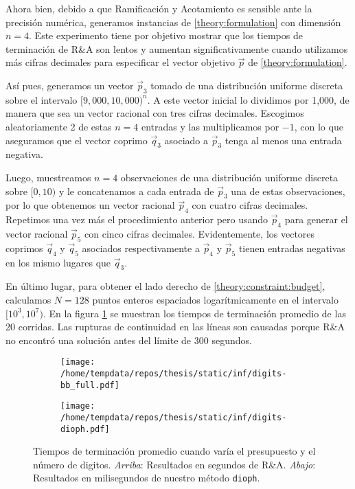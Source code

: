 Ahora bien, debido a que Ramificación y Acotamiento es sensible ante la precisión numérica,
generamos instancias de \eqref{theory:formulation} con dimensión $n = 4$. Este experimento tiene por
objetivo mostrar que los tiempos de terminación de R\&A son lentos y aumentan significativamente
cuando utilizamos más cifras decimales para especificar el vector objetivo $\vec{p}$ de
\eqref{theory:formulation}.

Así pues, generamos un vector $\vec{p}_3$ tomado de una distribución uniforme discreta sobre el
intervalo $[9{,}000, 10{,}000)^n$. A este vector inicial lo dividimos por 1{,}000, de manera que sea un
vector racional con tres cifras decimales. Escogimos aleatoriamente 2 de estas $n = 4$ entradas y
las multiplicamos por $-1$, con lo que aseguramos que el vector coprimo $\vec{q}_3$ asociado a
$\vec{p}_3$ tenga al menos una entrada negativa.

Luego, muestreamos $n = 4$ observaciones de una distribución uniforme discreta sobre $[0, 10)$ y le
concatenamos a cada entrada de $\vec{p}_3$ una de estas observaciones, por lo que obtenemos un
vector racional $\vec{p}_4$ con cuatro cifras decimales. Repetimos una vez más el procedimiento
anterior pero usando $\vec{p}_4$ para generar el vector racional $\vec{p}_5$ con cinco cifras
decimales. Evidentemente, los vectores coprimos $\vec{q}_4$ y $\vec{q}_5$ asociados respectivamente
a $\vec{p}_4$ y $\vec{p}_5$ tienen entradas negativas en los mismo lugares que $\vec{q}_3$.

En último lugar, para obtener el lado derecho de \eqref{theory:constraint:budget}, calculamos $N = 128$
puntos enteros espaciados logarítmicamente en el intervalo $[10^3, 10^7)$. En la figura
\ref{fig:exp:inf:rhs} se muestran los tiempos de terminación promedio de las 20 corridas. Las
rupturas de continuidad en las líneas son causadas porque R\&A no encontró una solución antes del
límite de 300 segundos.

\begin{figure}[hbtp]
  \centering
  \begin{subfigure}{0.80\textwidth}
    \centering
    \texttt{[image: /home/tempdata/repos/thesis/static/inf/digits-bb\_full.pdf]}
  \end{subfigure}
  \hfill
  \begin{subfigure}{0.80\textwidth}
    \centering
    \texttt{[image: /home/tempdata/repos/thesis/static/inf/digits-dioph.pdf]}
  \end{subfigure}

  \caption{Tiempos de terminación promedio cuando varía el presupuesto y el
			número de digitos. \textit{Arriba}: Resultados en segundos de R\&A. \textit{Abajo}:
			Resultados en milisegundos de nuestro método \texttt{dioph}.}
  \label{fig:exp:inf:rhs}
\end{figure}

